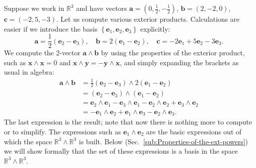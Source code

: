 Suppose we work in $\mathbb{R}^{3}$ and have vectors $\mathbf{a}=\left(0,\frac{1}{2},-\frac{1}{2}\right)$,
$\mathbf{b}=\left(2,-2,0\right)$, $\mathbf{c}=\left(-2,5,-3\right)$.
Let us compute various exterior products. Calculations are easier
if we introduce the basis $\left\{ \mathbf{e}_{1},\mathbf{e}_{2},\mathbf{e}_{3}\right\} $
explicitly:\[
\mathbf{a}=\frac{1}{2}\left(\mathbf{e}_{2}-\mathbf{e}_{3}\right),\quad\mathbf{b}=2(\mathbf{e}_{1}-\mathbf{e}_{2}),\quad\mathbf{c}=-2\mathbf{e}_{1}+5\mathbf{e}_{2}-3\mathbf{e}_{3}.\]
We compute the 2-vector $\mathbf{a}\wedge\mathbf{b}$ by using the
properties of the exterior product, such as $\mathbf{x}\wedge\mathbf{x}=0$
and $\mathbf{x}\wedge\mathbf{y}=-\mathbf{y}\wedge\mathbf{x}$, and
simply expanding the brackets as usual in algebra:\begin{align*}
\mathbf{a}\wedge\mathbf{b} & =\frac{1}{2}\left(\mathbf{e}_{2}-\mathbf{e}_{3}\right)\wedge2\left(\mathbf{e}_{1}-\mathbf{e}_{2}\right)\\
 & =\left(\mathbf{e}_{2}-\mathbf{e}_{3}\right)\wedge\left(\mathbf{e}_{1}-\mathbf{e}_{2}\right)\\
 & =\mathbf{e}_{2}\wedge\mathbf{e}_{1}-\mathbf{e}_{3}\wedge\mathbf{e}_{1}-\mathbf{e}_{2}\wedge\mathbf{e}_{2}+\mathbf{e}_{3}\wedge\mathbf{e}_{2}\\
 & =-\mathbf{e}_{1}\wedge\mathbf{e}_{2}+\mathbf{e}_{1}\wedge\mathbf{e}_{3}-\mathbf{e}_{2}\wedge\mathbf{e}_{3}.\end{align*}
The last expression is the result; note that now there is nothing
more to compute or to simplify. The expressions such as $\mathbf{e}_{1}\wedge\mathbf{e}_{2}$
are the basic expressions out of which the space $\mathbb{R}^{3}\wedge\mathbb{R}^{3}$
is built. Below (Sec.~\ref{sub:Properties-of-the-ext-powers}) we
will show formally that the set of these expressions is a basis in
the space $\mathbb{R}^{3}\wedge\mathbb{R}^{3}$.

